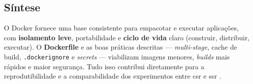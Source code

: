 \subsection{Síntese}
\label{sec:docker-sintese}

O Docker fornece uma base consistente para empacotar e executar aplicações, com \textbf{isolamento leve}, portabilidade e \textbf{ciclo de vida} claro (construir, distribuir, executar). O \textbf{Dockerfile} e as boas práticas descritas — \textit{multi-stage}, cache de build, \texttt{.dockerignore} e \textit{secrets} — viabilizam imagens menores, \textit{builds} mais rápidos e maior segurança. Tudo isso contribui diretamente para a reprodutibilidade e a comparabilidade dos experimentos entre \acrshort{csr} e \acrshort{ssr} \cite{docker_overview,dockerfile_ref}. 
